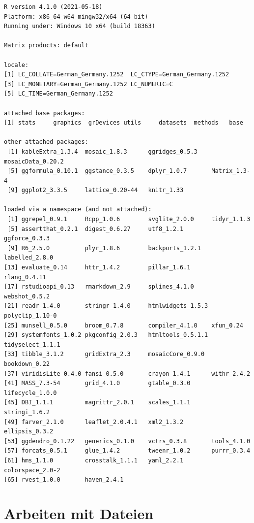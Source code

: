 \documentclass[
  ngerman,
]{scrbook}
\begin{document}
\begin{verbatim}
R version 4.1.0 (2021-05-18)
Platform: x86_64-w64-mingw32/x64 (64-bit)
Running under: Windows 10 x64 (build 18363)

Matrix products: default

locale:
[1] LC_COLLATE=German_Germany.1252  LC_CTYPE=German_Germany.1252   
[3] LC_MONETARY=German_Germany.1252 LC_NUMERIC=C                   
[5] LC_TIME=German_Germany.1252    

attached base packages:
[1] stats     graphics  grDevices utils     datasets  methods   base     

other attached packages:
 [1] kableExtra_1.3.4  mosaic_1.8.3      ggridges_0.5.3    mosaicData_0.20.2
 [5] ggformula_0.10.1  ggstance_0.3.5    dplyr_1.0.7       Matrix_1.3-4     
 [9] ggplot2_3.3.5     lattice_0.20-44   knitr_1.33       

loaded via a namespace (and not attached):
 [1] ggrepel_0.9.1     Rcpp_1.0.6        svglite_2.0.0     tidyr_1.1.3      
 [5] assertthat_0.2.1  digest_0.6.27     utf8_1.2.1        ggforce_0.3.3    
 [9] R6_2.5.0          plyr_1.8.6        backports_1.2.1   labelled_2.8.0   
[13] evaluate_0.14     httr_1.4.2        pillar_1.6.1      rlang_0.4.11     
[17] rstudioapi_0.13   rmarkdown_2.9     splines_4.1.0     webshot_0.5.2    
[21] readr_1.4.0       stringr_1.4.0     htmlwidgets_1.5.3 polyclip_1.10-0  
[25] munsell_0.5.0     broom_0.7.8       compiler_4.1.0    xfun_0.24        
[29] systemfonts_1.0.2 pkgconfig_2.0.3   htmltools_0.5.1.1 tidyselect_1.1.1 
[33] tibble_3.1.2      gridExtra_2.3     mosaicCore_0.9.0  bookdown_0.22    
[37] viridisLite_0.4.0 fansi_0.5.0       crayon_1.4.1      withr_2.4.2      
[41] MASS_7.3-54       grid_4.1.0        gtable_0.3.0      lifecycle_1.0.0  
[45] DBI_1.1.1         magrittr_2.0.1    scales_1.1.1      stringi_1.6.2    
[49] farver_2.1.0      leaflet_2.0.4.1   xml2_1.3.2        ellipsis_0.3.2   
[53] ggdendro_0.1.22   generics_0.1.0    vctrs_0.3.8       tools_4.1.0      
[57] forcats_0.5.1     glue_1.4.2        tweenr_1.0.2      purrr_0.3.4      
[61] hms_1.1.0         crosstalk_1.1.1   yaml_2.2.1        colorspace_2.0-2 
[65] rvest_1.0.0       haven_2.4.1      
\end{verbatim}

\hypertarget{arbeiten-mit-dateien}{%
\section{Arbeiten mit Dateien}\label{arbeiten-mit-dateien}}
\end{document}
